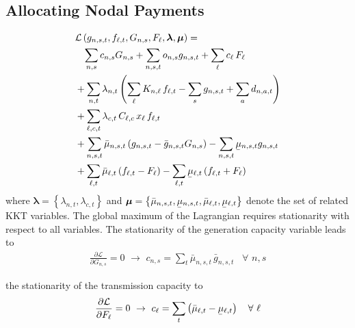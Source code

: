 \documentclass[11pt,twocolumn]{article}
\newcommand{\ubar}[1]{\underaccent{\bar}{#1}}
\newcommand{\generation}[1][n]{g_{#1,s,t}}
\newcommand{\generationpotential}{\bar{g}_{n,s,t}}
\newcommand{\capacityGeneration}{G_{n,s}}
\newcommand{\capacityFlow}{F_{\ell}}
\newcommand{\capexGeneration}{c_{n,s}}
\newcommand{\capexFlow}{c_{\ell}}
\newcommand{\opexGeneration}[1][n]{o_{#1,s}}
\newcommand{\demand}[1][n]{d_{#1,a,t}}
\newcommand{\incidence}[1][n]{K_{#1,\ell}}
\newcommand{\mulowergeneration}[1][n]{\ubar{\mu}_{#1,s,t}}
\newcommand{\muuppergeneration}[1][n]{\bar{\mu}_{#1,s,t}}
\newcommand{\mulowerflow}{\ubar{\mu}_{\ell,t}}
\newcommand{\muupperflow}{\bar{\mu}_{\ell,t}}
\newcommand{\lmp}[1][n]{\lambda_{#1,t}}
\newcommand{\flow}{f_{\ell,t}}
\newcommand{\cycle}{C_{\ell,c}}
\newcommand{\impedance}{x_\ell}
\newcommand{\cycleprice}{\lambda_{c,t}}
\newcommand{\lagrangian}{\mathcal{L}}
\newcommand{\Forall}[1]{\hspace{10pt} \forall \,\, #1 }
\newcommand{\pdv}[2]{\frac{\partial #1}{\partial #2}}
\begin{document}
\subsection{Allocating Nodal Payments}
\begin{align}
\notag
& \lagrangian\left(\generation, \flow, \capacityGeneration, \capacityFlow, \boldsymbol{\lambda}, \boldsymbol{\mu} \right)   =   \\  
\notag
& \;\;\; \sum_{n,s} \capexGeneration \capacityGeneration + \sum_{n, s, t} \opexGeneration \generation + \sum_{\ell} \capexFlow \, \capacityFlow  \\
\notag
&+ \sum_{n,t} \lmp \left(\sum_\ell \incidence \, \flow  - \sum_s \generation + \sum_a \demand  \right)  \\ 
\notag
&+ \sum_{\ell,c,t} \cycleprice \, \cycle \, \impedance \, \flow  \\
\notag
&+ \sum_{n,s,t} \muuppergeneration \left( \generation - \generationpotential \capacityGeneration \right)  - \sum_{n,s,t} \mulowergeneration \generation  \\
&+ \sum_{\ell,t} \muupperflow \left( \flow - \capacityFlow \right) - \sum_{\ell,t} \mulowerflow \left( \flow + \capacityFlow \right)     
\label{eq:full_lagrangian}
\end{align}
% 
where $\boldsymbol{\lambda} = \left\lbrace \lmp, \cycleprice \right\rbrace $ and $\boldsymbol{\mu} = \left\lbrace \muuppergeneration, \mulowergeneration, \muupperflow, \mulowerflow \right\rbrace $ denote the set of related KKT variables. The global maximum of the Lagrangian requires stationarity with respect to all variables. The stationarity of the generation capacity variable leads to 
\begin{align}
\pdv{\lagrangian}{\capacityGeneration}  = 0 \,\, \rightarrow \,\, 
\capexGeneration =  \sum_t \muuppergeneration \, \generationpotential  \Forall{n,s}
\label{eq:capexGeneration_duality}
\end{align}

the stationarity of the transmission capacity to
\begin{align}
\pdv{\lagrangian}{\capacityFlow} = 0 \,\, \rightarrow \,\, 
\capexFlow =  \sum_t \left( \muupperflow - \mulowerflow \right) \Forall{\ell}
\label{eq:capexFlow_duality}
\end{align}
\end{document}
